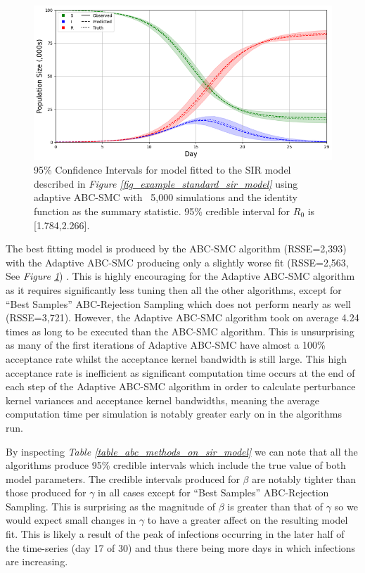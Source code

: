 \documentclass[11pt,a4paper]{article}
\theoremstyle{break}
\begin{document}
  \begin{figure}[H]
    \centering\includegraphics[width=.7\textwidth]{Semi_Auto_ABC_SMC_full_data_CI.png}
    \caption{95\% Confidence Intervals for model fitted to the SIR model described in \textit{Figure \ref{fig_example_standard_sir_model}} using adaptive ABC-SMC with ~5,000 simulations and the identity function as the summary statistic. 95\% credible interval for $R_0$ is [1.784,2.266].}
    \label{fig_abc_smc_sir_identity_95_ci}
  \end{figure}

  \par The best fitting model is produced by the ABC-SMC algorithm (RSSE=2,393) with the Adaptive ABC-SMC producing only a slightly worse fit (RSSE=2,563, See \textit{Figure \ref{fig_abc_smc_sir_identity_95_ci}}) . This is highly encouraging for the Adaptive ABC-SMC algorithm as it requires significantly less tuning then all the other algorithms, except for ``Best Samples'' ABC-Rejection Sampling which does not perform nearly as well (RSSE=3,721). However, the Adaptive ABC-SMC algorithm took on average 4.24 times as long to be executed than the ABC-SMC algorithm. This is unsurprising as many of the first iterations of Adaptive ABC-SMC have almost a 100\% acceptance rate whilst the acceptance kernel bandwidth is still large. This high acceptance rate is inefficient as significant computation time occurs at the end of each step of the Adaptive ABC-SMC algorithm in order to calculate perturbance kernel variances and acceptance kernel bandwidths, meaning the average computation time per simulation is notably greater early on in the algorithms run.

  \par By inspecting \textit{Table \ref{table_abc_methods_on_sir_model}} we can note that all the algorithms produce 95\% credible intervals which include the true value of both model parameters. The credible intervals produced for $\beta$ are notably tighter than those produced for $\gamma$ in all cases except for ``Best Samples'' ABC-Rejection Sampling. This is surprising as the magnitude of $\beta$ is greater than that of $\gamma$ so we would expect small changes in $\gamma$ to have a greater affect on the resulting model fit. This is likely a result of the peak of infections occurring in the later half of the time-series (day 17 of 30) and thus there being more days in which infections are increasing.
\end{document}
